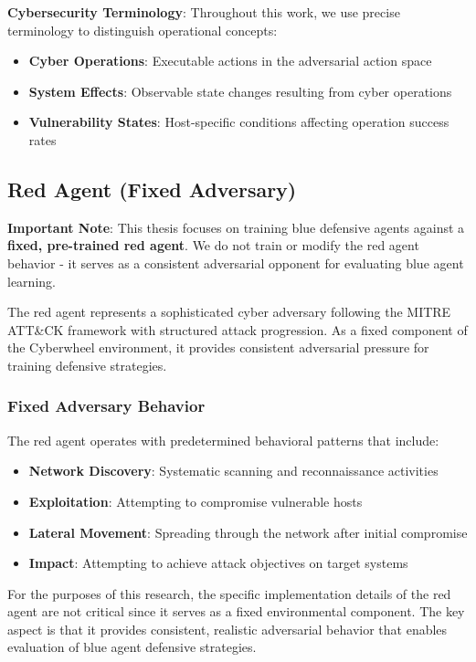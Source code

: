 \documentclass[12pt]{article}
\theoremstyle{definition}
\theoremstyle{plain}
\begin{document}
\textbf{Cybersecurity Terminology}: Throughout this work, we use precise terminology to distinguish operational concepts:
\begin{itemize}
\item \textbf{Cyber Operations}: Executable actions in the adversarial action space
\item \textbf{System Effects}: Observable state changes resulting from cyber operations
\item \textbf{Vulnerability States}: Host-specific conditions affecting operation success rates
\end{itemize}

\subsection{Red Agent (Fixed Adversary)}

\textbf{Important Note}: This thesis focuses on training blue defensive agents against a \textbf{fixed, pre-trained red agent}. We do not train or modify the red agent behavior - it serves as a consistent adversarial opponent for evaluating blue agent learning.

The red agent represents a sophisticated cyber adversary following the MITRE ATT\&CK framework with structured attack progression. As a fixed component of the Cyberwheel environment, it provides consistent adversarial pressure for training defensive strategies.

\subsubsection{Fixed Adversary Behavior}
The red agent operates with predetermined behavioral patterns that include:
\begin{itemize}
\item \textbf{Network Discovery}: Systematic scanning and reconnaissance activities
\item \textbf{Exploitation}: Attempting to compromise vulnerable hosts
\item \textbf{Lateral Movement}: Spreading through the network after initial compromise
\item \textbf{Impact}: Attempting to achieve attack objectives on target systems
\end{itemize}

For the purposes of this research, the specific implementation details of the red agent are not critical since it serves as a fixed environmental component. The key aspect is that it provides consistent, realistic adversarial behavior that enables evaluation of blue agent defensive strategies.
\end{document}
